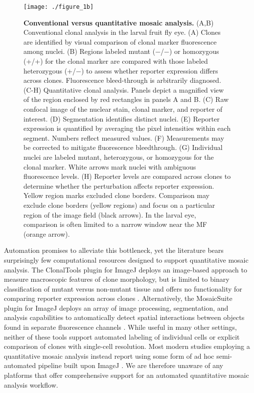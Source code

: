 \begin{figure}[!h]
\centering
\texttt{[image: ./figure\_1b]}
\caption[Conventional versus quantitative mosaic analysis.]{\textbf{Conventional versus quantitative mosaic analysis.} (A,B) Conventional clonal analysis in the larval fruit fly eye. (A) Clones are identified by visual comparison of clonal marker fluorescence among nuclei. (B) Regions labeled mutant (−/−) or homozygous (+/+) for the clonal marker are compared with those labeled heterozygous (+/−) to assess whether reporter expression differs across clones. Fluorescence bleed-through is arbitrarily diagnosed. (C-H) Quantitative clonal analysis. Panels depict a magnified view of the region enclosed by red rectangles in panels A and B. (C) Raw confocal image of the nuclear stain, clonal marker, and reporter of interest. (D) Segmentation identifies distinct nuclei. (E) Reporter expression is quantified by averaging the pixel intensities within each segment. Numbers reflect measured values. (F) Measurements may be corrected to mitigate fluorescence bleedthrough. (G) Individual nuclei are labeled mutant, heterozygous, or homozygous for the clonal marker. White arrows mark nuclei with ambiguous fluorescence levels. (H) Reporter levels are compared across clones to determine whether the perturbation affects reporter expression. Yellow region marks excluded clone borders. Comparison may exclude clone borders (yellow regions) and focus on a particular region of the image field (black arrows). In the larval eye, comparison is often limited to a narrow window near the MF (orange arrow).}
\label{fig:clones:fig1b}
\end{figure}

Automation promises to alleviate this bottleneck, yet the literature bears surprisingly few computational resources designed to support quantitative mosaic analysis. The ClonalTools plugin for ImageJ deploys an image-based approach to measure macroscopic features of clone morphology, but is limited to binary classification of mutant versus non-mutant tissue and offers no functionality for comparing reporter expression across clones \cite{Mort2009}. Alternatively, the MosaicSuite plugin for ImageJ deploys an array of image processing, segmentation, and analysis capabilities to automatically detect spatial interactions between objects found in separate fluorescence channels \cite{Helmuth2010,Shivanandan2013}. While useful in many other settings, neither of these tools support automated labeling of individual cells or explicit comparison of clones with single-cell resolution. Most modern studies employing a quantitative mosaic analysis instead report using some form of ad hoc semi-automated pipeline built upon ImageJ \cite{Dai2017,Ghiglione2018,Li2018}. We are therefore unaware of any platforms that offer comprehensive support for an automated quantitative mosaic analysis workflow.


